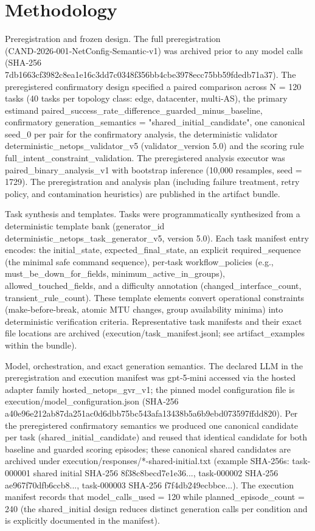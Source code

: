 \documentclass[conference]{IEEEtran}
\begin{document}
\section{Methodology}
Preregistration and frozen design. The full preregistration (CAND‑2026‑001‑NetConfig‑Semantic‑v1) was archived prior to any model calls (SHA‑256 7db1663cf3982c8ea1e16c3dd7c0348f356bb4cbe3978ecc75bb59fdedb71a37). The preregistered confirmatory design specified a paired comparison across N = 120 tasks (40 tasks per topology class: edge, datacenter, multi‑AS), the primary estimand paired\_success\_rate\_difference\_guarded\_minus\_baseline, confirmatory generation\_semantics = "shared\_initial\_candidate", one canonical seed\_0 per pair for the confirmatory analysis, the deterministic validator deterministic\_netops\_validator\_v5 (validator\_version 5.0) and the scoring rule full\_intent\_constraint\_validation. The preregistered analysis executor was paired\_binary\_analysis\_v1 with bootstrap inference (10,000 resamples, seed = 1729). The preregistration and analysis plan (including failure treatment, retry policy, and contamination heuristics) are published in the artifact bundle.

Task synthesis and templates. Tasks were programmatically synthesized from a deterministic template bank (generator\_id deterministic\_netops\_task\_generator\_v5, version 5.0). Each task manifest entry encodes: the initial\_state, expected\_final\_state, an explicit required\_sequence (the minimal safe command sequence), per‑task workflow\_policies (e.g., must\_be\_down\_for\_fields, minimum\_active\_in\_groups), allowed\_touched\_fields, and a difficulty annotation (changed\_interface\_count, transient\_rule\_count). These template elements convert operational constraints (make‑before‑break, atomic MTU changes, group availability minima) into deterministic verification criteria. Representative task manifests and their exact file locations are archived (execution/task\_manifest.jsonl; see artifact\_examples within the bundle).

Model, orchestration, and exact generation semantics. The declared LLM in the preregistration and execution manifest was gpt‑5‑mini accessed via the hosted adapter family hosted\_netops\_gvr\_v1; the pinned model configuration file is execution/model\_configuration.json (SHA‑256 a40e96e212ab87da251ac0d6dbb75bc543afa13438b5a6b9ebd073597ffdd820). Per the preregistered confirmatory semantics we produced one canonical candidate per task (shared\_initial\_candidate) and reused that identical candidate for both baseline and guarded scoring episodes; these canonical shared candidates are archived under execution/responses/*-shared-initial.txt (example SHA‑256s: task-000001 shared initial SHA‑256 8f38c8becd7e1e36..., task-000002 SHA‑256 ae967f70dfb6ccb8..., task-000003 SHA‑256 f7f4db249ecbbce...). The execution manifest records that model\_calls\_used = 120 while planned\_episode\_count = 240 (the shared\_initial design reduces distinct generation calls per condition and is explicitly documented in the manifest).
\end{document}
